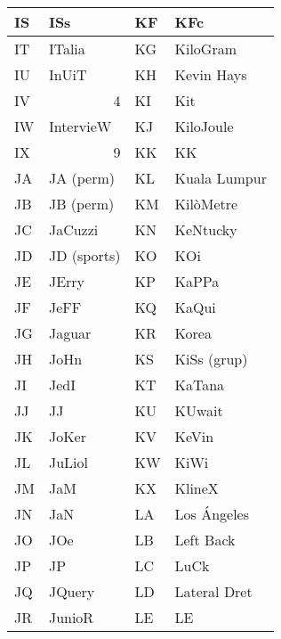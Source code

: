 \begin{table}[!ht]
    \centering
    \begin{tabular}{|l|l|l|l|}
    \hline
    IS & ISs                    & KF & KFc            \\ \hline
    IT & ITalia                 & KG & KiloGram       \\ \hline
    IU & InUiT                  & KH & Kevin Hays     \\ \hline
    IV & \multicolumn{1}{r|}{4} & KI & Kit            \\ \hline
    IW & IntervieW              & KJ & KiloJoule      \\ \hline
    IX & \multicolumn{1}{r|}{9} & KK & KK             \\ \hline
    JA & JA (perm)              & KL & Kuala Lumpur   \\ \hline
    JB & JB (perm)              & KM & KilòMetre      \\ \hline
    JC & JaCuzzi                & KN & KeNtucky       \\ \hline
    JD & JD (sports)            & KO & KOi            \\ \hline
    JE & JErry                  & KP & KaPPa          \\ \hline
    JF & JeFF                   & KQ & KaQui          \\ \hline
    JG & Jaguar                 & KR & Korea          \\ \hline
    JH & JoHn                   & KS & KiSs  (grup)   \\ \hline
    JI & JedI                   & KT & KaTana         \\ \hline
    JJ & JJ                     & KU & KUwait         \\ \hline
    JK & JoKer                  & KV & KeVin          \\ \hline
    JL & JuLiol                 & KW & KiWi           \\ \hline
    JM & JaM                    & KX & KlineX         \\ \hline
    JN & JaN                    & LA & Los Ángeles    \\ \hline
    JO & JOe                    & LB & Left Back      \\ \hline
    JP & JP                     & LC & LuCk           \\ \hline
    JQ & JQuery                 & LD & Lateral Dret   \\ \hline
    JR & JunioR                 & LE & LE             \\ \hline

\end{tabular}
\end{table}
